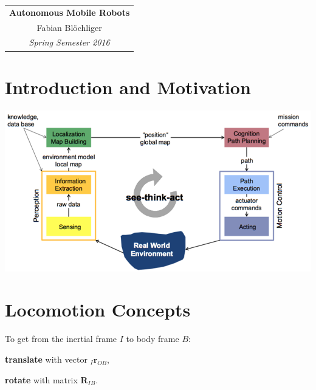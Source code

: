 \documentclass[landscape]{article}
\newcommand{\vmspace}{\vspace{-7pt}}
\newcommand{\vtspace}{\vspace{-10pt}}
\begin{document}
\pagestyle{empty}
\raggedright
\setlength{\columnsep}{2mm}
\setlength{\columnseprule}{0.1mm}
\renewcommand{\labelitemi}{--}

\begin{multicols}{3}


\begin{tabular}{|c|}\hline
  \LARGE \textbf{Autonomous Mobile Robots}\\[6pt]
  \large Fabian Bl\"ochliger\\[6pt]
  \large \textit{Spring Semester 2016}\\\hline
\end{tabular}

\vtspace

\section{Introduction and Motivation}

\vmspace

\includegraphics[width=\columnwidth]{img/1_SeeThinkAct.png}

\vspace{-12pt}

\section{Locomotion Concepts}

\vmspace

\begin{minipage}{\columnwidth}
  To get from the inertial frame $I$ to body frame $B$:
  \begin{compactitem}
    \item \textbf{translate} with vector ${}_I\mathbf{r}_{OB}$,
    \item \textbf{rotate} with matrix $\mathbf{R}_{IB}$.
  \end{compactitem}
\end{minipage}


\end{multicols}
\end{document}
